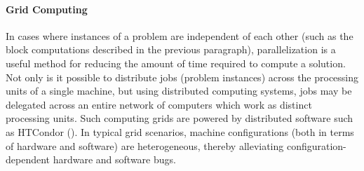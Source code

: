 \paragraph{Grid Computing}
In cases where instances of a problem are independent of each other (such as the block computations described in the previous paragraph), parallelization is a useful method for reducing the amount of time required to compute a solution. Not only is it possible to distribute jobs (problem instances) across the processing units of a single machine, but using distributed computing systems, jobs may be delegated across an entire network of computers which work as distinct processing units. Such computing grids are powered by distributed software such as HTCondor (\cite{condor}). In typical grid scenarios, machine configurations (both in terms of hardware and software) are heterogeneous, thereby alleviating configuration-dependent hardware and software bugs. 